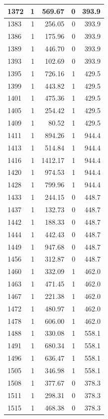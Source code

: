 \documentclass[
  spanish,
  12pt,
]{book}
\begin{document}
\begin{tabular}{l|r|r|r|r}
\hline
1372 & 1 & 569.67 & 0 & 393.9\\
\hline
1383 & 1 & 256.05 & 0 & 393.9\\
\hline
1386 & 1 & 175.96 & 0 & 393.9\\
\hline
1389 & 1 & 446.70 & 0 & 393.9\\
\hline
1393 & 1 & 102.69 & 0 & 393.9\\
\hline
1395 & 1 & 726.16 & 1 & 429.5\\
\hline
1399 & 1 & 443.82 & 1 & 429.5\\
\hline
1401 & 1 & 475.36 & 1 & 429.5\\
\hline
1405 & 1 & 254.42 & 1 & 429.5\\
\hline
1409 & 1 & 80.52 & 1 & 429.5\\
\hline
1411 & 1 & 894.26 & 1 & 944.4\\
\hline
1413 & 1 & 514.84 & 1 & 944.4\\
\hline
1416 & 1 & 1412.17 & 1 & 944.4\\
\hline
1420 & 1 & 974.53 & 1 & 944.4\\
\hline
1428 & 1 & 799.96 & 1 & 944.4\\
\hline
1433 & 1 & 244.15 & 0 & 448.7\\
\hline
1437 & 1 & 132.73 & 0 & 448.7\\
\hline
1442 & 1 & 188.33 & 0 & 448.7\\
\hline
1444 & 1 & 442.43 & 0 & 448.7\\
\hline
1449 & 1 & 947.68 & 0 & 448.7\\
\hline
1456 & 1 & 312.87 & 0 & 448.7\\
\hline
1460 & 1 & 332.09 & 1 & 462.0\\
\hline
1463 & 1 & 471.45 & 1 & 462.0\\
\hline
1467 & 1 & 221.38 & 1 & 462.0\\
\hline
1472 & 1 & 480.97 & 1 & 462.0\\
\hline
1478 & 1 & 606.00 & 1 & 462.0\\
\hline
1488 & 1 & 330.08 & 1 & 558.1\\
\hline
1491 & 1 & 680.34 & 1 & 558.1\\
\hline
1496 & 1 & 636.47 & 1 & 558.1\\
\hline
1505 & 1 & 346.98 & 1 & 558.1\\
\hline
1508 & 1 & 377.67 & 0 & 378.3\\
\hline
1511 & 1 & 298.31 & 0 & 378.3\\
\hline
1515 & 1 & 468.38 & 0 & 378.3\\

\end{tabular}
\end{document}
